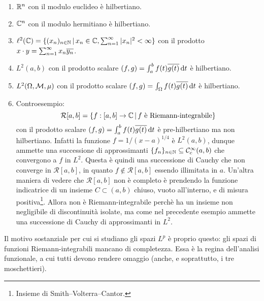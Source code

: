 \begin{example}
	\leavevmode
	\begin{enumerate}
		\item $\mathbb{R}^n$ con il modulo euclideo è hilbertiano.
		\item $\mathbb{C}^n$ con il modulo hermitiano è hilbertiano.
		\item $\ell^2(\mathbb{C}) = \{ (x_n)_{n \in \mathbb{N}} \,|\, x_n \in \mathbb{C}, \sum_{n=1}^\infty |x_n|^2 < \infty\}$ con il prodotto $x \cdot y = \sum_{n=1}^\infty x_n \overline{y_n}$.
		\item $L^2(a,b)$ con il prodotto scalare $(f,g) = \int_a^b f(t)\overline{g(t)}\,\mathrm{d} t$ è hilbertiano.
		\item $L^2(\Omega, \mathcal{M}, \mu)$ con il prodotto scalare $(f,g) = \int_\Omega f(t)\overline{g(t)}\,\mathrm{d} t$ è hilbertiano.
		\item Controesempio:
		\begin{equation*}
			\mathcal R[a,b] = \{f :[a,b] \to \mathbb{C} \,|\, \text{$f$ è Riemann-integrabile} \}
		\end{equation*}
		con il prodotto scalare $(f,g) = \int_a^b f(t)\overline{g(t)}\,\mathrm{d} t$ è pre-hilbertiano ma non hilbertiano.
		Infatti la funzione $f = 1/(x-a)^{1/4}$ è $L^2(a,b)$, dunque ammette una successione di approssimanti $\{f_n\}_{n \in \mathbb{N}} \subseteq \mathcal{C}^\infty_c(a,b)$ che convergono a $f$ in $L^2$. Questa è quindi una successione di Cauchy che non converge in $\mathcal R[a,b]$, in quanto $f \notin \mathcal R[a,b]$ essendo illimitata in $a$.
		Un'altra maniera di vedere che $\mathcal R[a,b]$ non è completo è prendendo la funzione indicatrice di un insieme $C \subset (a,b)$ chiuso, vuoto all'interno, e di misura positiva\footnote{Insieme di Smith--Volterra--Cantor.}. Allora non è Riemann-integrabile perchè ha un insieme non negligibile di discontinuità isolate, ma come nel precedente esempio ammette una successione di Cauchy di approssimanti in $L^2$.
	\end{enumerate}
\end{example}

\begin{remark}
	Il motivo sostanziale per cui si studiano gli spazi $L^p$ è proprio questo: gli spazi di funzioni Riemann-integrabili mancano di completezza. Essa è la regina dell'analisi funzionale, a cui tutti devono rendere omaggio (anche, e soprattutto, i tre moschettieri).
\end{remark}


